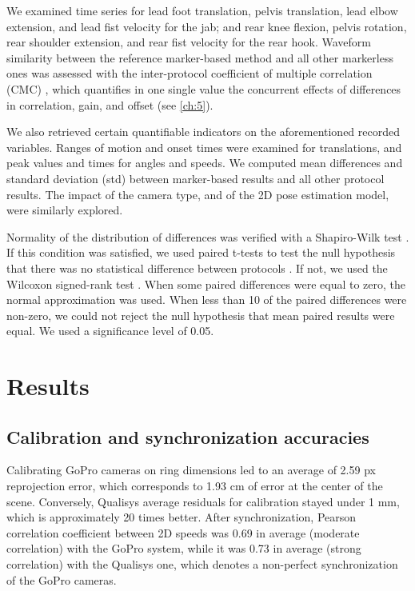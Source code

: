 We examined time series for lead foot translation, pelvis translation, lead elbow extension, and lead fist velocity for the jab; and rear knee flexion, pelvis rotation, rear shoulder extension, and rear fist velocity for the rear hook. 
Waveform similarity between the reference marker-based method and all other markerless ones was assessed with the inter-protocol coefficient of multiple correlation (CMC) \cite{Ferrari2010}, which quantifies in one single value the concurrent effects of differences in correlation, gain, and offset (see  \autoref{ch:5}).

We also retrieved certain quantifiable indicators on the aforementioned recorded variables. Ranges of motion and onset times were examined for translations, and peak values and times for angles and speeds. 
We computed mean differences and standard deviation (std) between marker-based results and all other protocol results. The impact of the camera type, and of the 2D pose estimation model, were similarly explored. 

Normality of the distribution of differences was verified with a Shapiro-Wilk test \cite{Shapiro1965}. If this condition was satisfied, we used paired t-tests to test the null hypothesis that there was no statistical difference between protocols \cite{Student1908}. If not, we used the Wilcoxon signed-rank test \cite{Wilcoxon1945}. When some paired differences were equal to zero, the normal approximation was used. When less than 10 of the paired differences were non-zero, we could not reject the null hypothesis that mean paired results were equal. We used a significance level of 0.05.


\section{Results}

\subsection{Calibration and synchronization accuracies}

Calibrating GoPro cameras on ring dimensions led to an average of 2.59 px reprojection error, which corresponds to 1.93 cm of error at the center of the scene. Conversely, Qualisys average residuals for calibration stayed under 1 mm, which is approximately 20 times better. After synchronization, Pearson correlation coefficient between 2D speeds was 0.69 in average (moderate correlation) with the GoPro system, while it was 0.73 in average (strong correlation) with the Qualisys one, which denotes a non-perfect synchronization of the GoPro cameras. 


